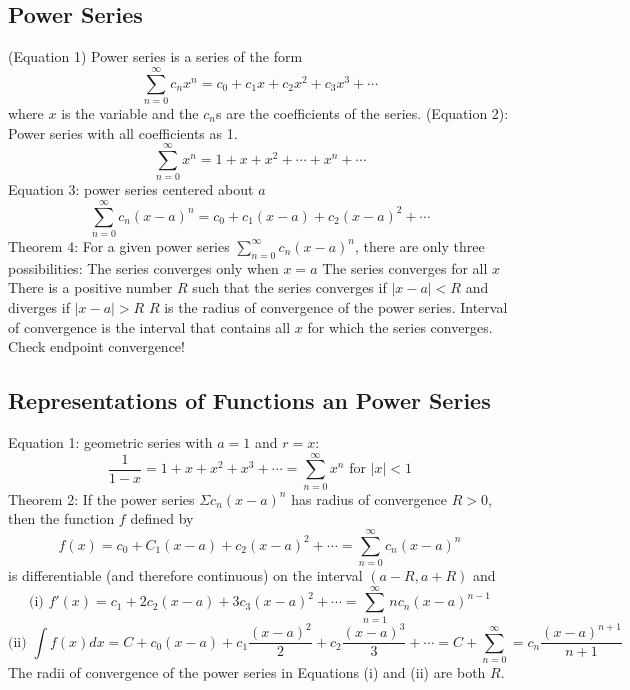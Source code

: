 \documentclass{article}
\begin{document}
    \subsection{Power Series}
    \begin{outline}
        \1 (Equation 1) Power series is a series of the form \[\sum^\infty_{n=0}c_nx^n=c_0+c_1x+c_2x^2+c_3x^3+\cdots\] where $x$ is the variable and the $c_n$s are the coefficients of the series. 
        \1 (Equation 2): Power series with all coefficients as 1. \[\sum^\infty_{n=0}x^n=1+x+x^2+\cdots+x^n+\cdots\]
        \1 Equation 3: power series centered about $a$ \[\sum^\infty_{n=0}c_n(x-a)^n=c_0+c_1(x-a)+c_2(x-a)^2+\cdots\]
        \1 Theorem 4: For a given power series \(\sum^\infty_{n=0}c_n(x-a)^n\), there are only three possibilities: 
            \2 The series converges only when \(x=a\)
            \2 The series converges for all $x$
            \2 There is a positive number $R$ such that the series converges if \(|x-a|<R\) and diverges if \(|x-a|>R\)
        \1 $R$ is the radius of convergence of the power series. Interval of convergence is the interval that contains all $x$ for which the series converges. 
        \1 Check endpoint convergence!

    \end{outline}
    \subsection{Representations of Functions an Power Series}
    \begin{outline}
        \1 Equation 1: geometric series with \(a=1\) and \(r=x\): \[\dfrac{1}{1-x}=1+x+x^2+x^3+\cdots=\sum^\infty_{n=0}x^n\mbox{ for }|x|<1\]
        \1 Theorem 2: If the power series \(\Sigma c_n(x-a)^n\) has radius of convergence \(R>0\), then the function $f$ defined by \[f(x)=c_0+C_1(x-a)+c_2(x-a)^2+\cdots=\sum_{n=0}^\infty c_n(x-a)^n\] is differentiable (and therefore continuous) on the interval \((a-R, a+R)\) and \[\text{(i) }f'(x)=c_1+2c_2(x-a)+3c_3(x-a)^2+\cdots=\sum^\infty_{n=1}nc_n(x-a)^{n-1}\]\[\text{(ii) }\int f(x)dx=C+c_0(x-a)+c_1\dfrac{(x-a)^2}{2}+c_2\dfrac{(x-a)^3}{3}+\cdots=C+\sum^\infty_{n=0}=c_n\dfrac{(x-a)^{n+1}}{n+1}\] The radii of convergence of the power series in Equations (i) and (ii) are both $R$. 

    \end{outline}
\end{document}

